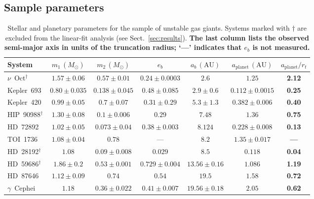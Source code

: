 \documentclass{aa}
\newcommand{\rev}[1]{{\color{red}\textbf{#1}}}
\begin{document}
\begin{appendix}
\section{Sample parameters}
\label{app:table}

\begin{table}
\centering
\caption{Stellar and planetary parameters for the sample of unstable gas
giants. Systems marked with $\dagger$ are excluded from the linear-fit
analysis (see Sect.~\ref{sec:results}). \rev{The last column lists the
observed semi-major axis in units of the \citet{Pichardo2005} truncation
radius; `---' indicates that $e_b$ is not measured.}}
\label{tab:stellar_params}
\small
\begin{tabular}{lcccccc}
\hline\hline
System & $m_1\,(M_\odot)$ & $m_2\,(M_\odot)$ & $e_b$ &
$a_b\,(\mathrm{AU})$ & $a_\mathrm{planet}\,(\mathrm{AU})$ & \rev{$a_\mathrm{planet}/r_t$} \\
\hline
$\nu$~Oct$^\dagger$     & $1.57\pm0.06$ & $0.57\pm0.01$  & $0.24\pm0.0003$ & $2.6$          & $1.25$ & \rev{2.12} \\
Kepler~693             & $0.80\pm0.035$& $0.138\pm0.045$& $0.48\pm0.085$  & $2.9\pm0.6$    & $0.112\pm0.0015$ & \rev{0.25} \\
Kepler~420             & $0.99\pm0.05$ & $0.7\pm0.07$   & $0.31\pm0.29$   & $5.3\pm1.3$    & $0.382\pm0.006$ & \rev{0.40} \\
HIP~90988$^\dagger$    & $1.30\pm0.08$ & $0.1\pm0.006$  & $0.29$          & $7.48$         & $1.36$ & \rev{0.75} \\
HD~72892               & $1.02\pm0.05$ & $0.073\pm0.04$ & $0.38\pm0.003$  & $8.124$        & $0.228\pm0.008$ & \rev{0.13} \\
TOI~1736               & $1.08\pm0.04$ & $0.78$         & ---             & $8.2$          & $1.35\pm0.017$ & \rev{---} \\
HD~28192$^\dagger$     & $1.08$        & $0.09\pm0.008$ & $0.029$         & $8.5$          & $0.118$ & \rev{0.04} \\
HD~59686$^\dagger$     & $1.86\pm0.2$  & $0.53\pm0.001$ & $0.729\pm0.004$ & $13.56\pm0.16$ & $1.086$ & \rev{1.19} \\
HD~87646               & $1.12\pm0.09$ & $0.74$         & $0.54$          & $19.5$         & $1.58$ & \rev{0.72} \\
$\gamma$~Cephei        & $1.18$        & $0.36\pm0.022$ & $0.41\pm0.007$  & $19.56\pm0.18$ & $2.05$ & \rev{0.62} \\

\end{tabular}
\end{table}
\end{appendix}
\end{document}
